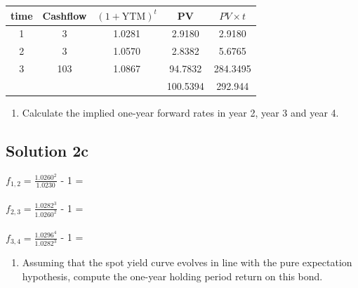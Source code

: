 \documentclass[12]{article}
\begin{document}
\begin{table}[H]
    \centering
    {\color{blue}\begin{tabular}{ccccc}
    \toprule
        time & Cashflow & $(1+\mathrm{YTM})^t$ & PV & $PV \times t$\\\midrule
        1 & 3 & 1.0281 & 2.9180 & 2.9180\\
        2 & 3 & 1.0570 & 2.8382 & 5.6765\\
        3 & 103 & 1.0867 & 94.7832 & 284.3495\\\midrule
         & &        & 100.5394 & 292.944\\ \bottomrule
    \end{tabular}}
    \label{tab:my_label}
\end{table}




\color{black}
\begin{enumerate}
    \item[c)] Calculate the implied one-year forward rates in year 2, year 3 and year 4.
\end{enumerate}

\color{blue}
\subsection*{Solution 2c}
$f_{1,2} = ${\Large $\frac{1.0260^2}{1.0230}$} - 1 = \\
\\
$f_{2,3} = ${\Large $\frac{1.0282^3}{1.0260^2}$} - 1 = \\
\\
$f_{3,4} = ${\Large $\frac{1.0296^4}{1.0282^3}$} - 1 = \\


\color{black}
\begin{enumerate}
    \item[d)] Assuming that the spot yield curve evolves in line with the pure expectation hypothesis, compute the one-year holding period return on this bond.
\end{enumerate}

\color{blue}
\end{document}
